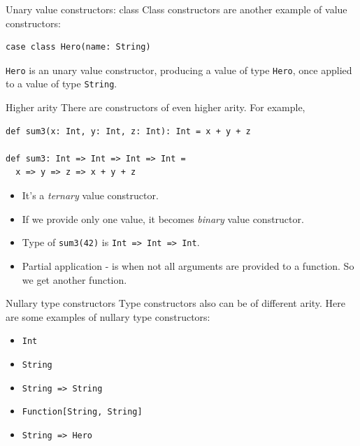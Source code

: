 \documentclass[presentation,aspectratio=169,smaller]{beamer}
\begin{document}
\begin{frame}[label={sec:org96521e9},fragile]{Unary value constructors: class}
 Class constructors are another example of value constructors:

\begin{verbatim}
case class Hero(name: String)
\end{verbatim}

\texttt{Hero} is an unary value constructor, producing a value of type \texttt{Hero}, once
applied to a value of type \texttt{String}.
\end{frame}

\begin{frame}[label={sec:org94f40a9},fragile]{Higher arity}
 There are constructors of even higher arity. For example,

\begin{verbatim}
def sum3(x: Int, y: Int, z: Int): Int = x + y + z

def sum3: Int => Int => Int => Int =
  x => y => z => x + y + z
\end{verbatim}

\pause

\begin{itemize}
\item <2-> It's a \emph{ternary} value constructor.
\item <3-> If we provide only one value, it becomes \emph{binary} value constructor.
\item <4-> Type of \texttt{sum3(42)} is \texttt{Int => Int => Int}.
\item <5-> \alert{Partial application} - is when not all arguments are provided to a
function. So we get another function.
\end{itemize}
\end{frame}

\begin{frame}[label={sec:org3391de4},fragile]{Nullary type constructors}
 Type constructors also can be of different arity. Here are some examples of
nullary type constructors:

\begin{itemize}
\item \texttt{Int}
\item \texttt{String}
\item \texttt{String => String}
\item \texttt{Function[String, String]}
\item \texttt{String => Hero}
\end{itemize}
\end{frame}
\end{document}
